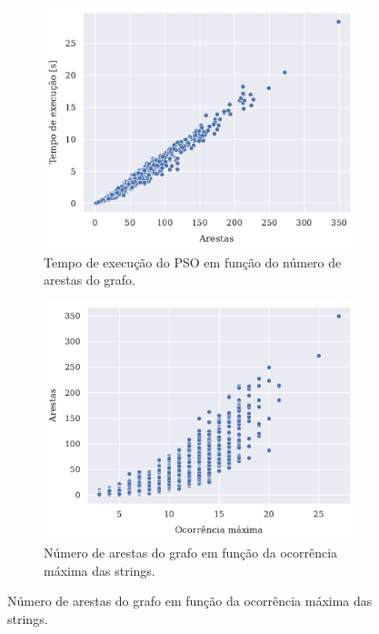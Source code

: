         \begin{figure}[htb]
            \centering
            \begin{subfigure}[b]{0.48\textwidth}
                \centering
                \includegraphics[width=\textwidth]{images/tempo-vs-arestas.pdf}
                \caption{Tempo de execução do PSO em função do número de arestas do grafo.}
                \label{fig:tempo-pso-vs-arestas}
            \end{subfigure} \hfill
            \begin{subfigure}[b]{0.48\textwidth}
                \centering
                \includegraphics[width=\textwidth]{images/arestas-vs-occ.pdf}
                \caption{Número de arestas do grafo em função da ocorrência máxima das strings.}

\end{subfigure}
\end{figure}
